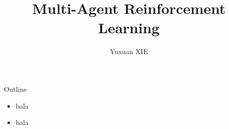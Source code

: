 \documentclass{beamer}
\title{Multi-Agent Reinforcement Learning}
\author{Yuxuan XIE}
\begin{document}
\frame{\maketitle} %

\begin{frame}{Outline}

  \begin{itemize}
    \item bala
    \item bala
  \end{itemize}

\end{frame}
\end{document}
